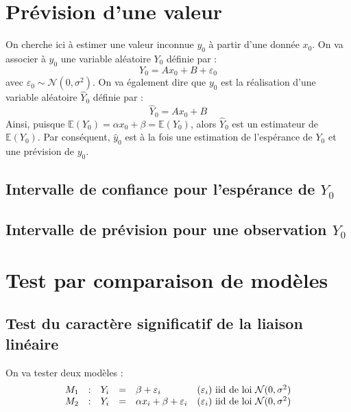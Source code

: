 \section{Prévision d'une valeur}
On cherche ici à estimer une valeur inconnue $y_0$ à partir d'une donnée $x_0$. On va associer à $y_0$ une variable aléatoire $Y_0$ définie par :
	\[Y_0=Ax_0+B+\varepsilon_0\]
avec $\varepsilon_0\sim\mathcal{N}(0,\sigma^2)$. On va également dire que $y_0$ est la réalisation d'une variable aléatoire $\hat{Y}_0$ définie par :
	\[\hat{Y}_0=Ax_0+B\]
Ainsi, puisque $\mathbb{E}(Y_0)=\alpha x_0+\beta=\mathbb{E}(Y_0)$, alors $\hat{Y}_0$ est un estimateur de $\mathbb{E}(Y_0)$. Par conséquent, $\hat{y}_0$ est à la fois une estimation de l'espérance de $Y_0$ et une prévision de $y_0$. 

\subsection{Intervalle de confiance pour l'espérance de $Y_0$}


\subsection{Intervalle de prévision pour une observation $Y_0$}


\section{Test par comparaison de modèles}
\subsection{Test du caractère significatif de la liaison linéaire}
On va tester deux modèles :
\[\begin{array}{c c c c l c}
	M_1 &:& Y_i&=&\beta+\varepsilon_i & (\varepsilon_i) \text{ iid de loi } \mathcal{N}(0,\sigma^2)\\
	M_2 &:& Y_i&=&\alpha x_i+\beta+\varepsilon_i & (\varepsilon_i) \text{ iid de loi } \mathcal{N}(0,\sigma^2)\\
\end{array}\]

